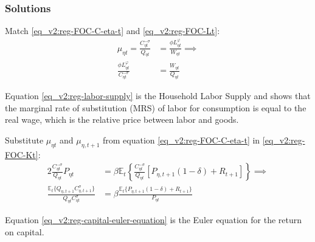\documentclass[../thesis.tex]{subfiles}
\begin{document}
\subsubsection*{Solutions}

Match \ref{eq_v2:reg-FOC-C-eta-t} and \ref{eq_v2:reg-FOC-Lt}:
\begin{align}
	\mu_{\eta t} = \frac{ C_{\eta t}^{-\sigma}}{Q_{\eta t}} &= \frac{\phi L_{\eta t}^{\varphi}}{W_{\eta t}} \implies \nonumber \\
	\frac{\phi L_{\eta t}^{\varphi}}{C_{\eta t}^{-\sigma}} &= \frac{W_{\eta t}}{Q_{\eta t}} \label{eq_v2:reg-labor-supply}
\end{align}

Equation \ref{eq_v2:reg-labor-supply} is the Household Labor Supply and shows that the marginal rate of substitution (MRS) of labor for consumption is equal to the real wage, which is the relative price between labor and goods.

Substitute $\mu_{\eta t}$ and $\mu_{\eta, t+1}$ from equation \ref{eq_v2:reg-FOC-C-eta-t} in \ref{eq_v2:reg-FOC-Kt}:
\begin{alignat}{2}
	\frac{C_{\eta t}^{-\sigma}}{Q_{\eta t}} P_{\eta t} &= \beta \mathbb{E}_{t} \left\{ \frac{C_{\eta t}^{-\sigma}}{Q_{\eta t}} [P_{\eta,t+1} (1 - \delta) + R_{t+1}] \right\} \implies \nonumber \\
	\frac{\mathbb{E}_{t} \{ Q_{\eta,t+1} C_{\eta,t+1}^{\sigma} \} }{ Q_{\eta t} C_{\eta t}^{\sigma} } &= \beta \frac{ \mathbb{E}_{t} \{ P_{\eta,t+1} (1 - \delta) + R_{t+1} \} }{P_{\eta t}} \label{eq_v2:reg-capital-euler-equation}
\end{alignat}


Equation \ref{eq_v2:reg-capital-euler-equation} is the Euler equation for the return on capital.

\begin{comment}

	Divide \ref{eq_v2:reg-capital-euler-equation} of region one by region two:
\begin{alignat}{2}
	\frac{\mathbb{E}_{t} \left\{Q_{1, t+1} C_{1, t+1}^{\sigma} \right\}}{\mathbb{E}_{t} \left\{Q_{2, t+1} C_{2, t+1}^{\sigma} \right\}} &= \frac{\beta (1 + R_{t}) Q_{1t} C_{1t}^{\sigma}}{\beta (1 + R_{t}) Q_{2t} C_{2t}^{\sigma}} \implies \nonumber \\
	\frac{\mathbb{E}_{t} \left\{ Q_{1, t+1} C_{1, t+1}^{\sigma} \right\}}{Q_{1t} C_{1t}^{\sigma}} &= \frac{\mathbb{E}_{t} \left\{ Q_{2, t+1} C_{2, t+1}^{\sigma} \right\}}{Q_{2t} C_{2t}^{\sigma}} \label{eq_v2:reg-bonds-euler-equation-2}
\end{alignat}
	
\end{comment}
\end{document}
